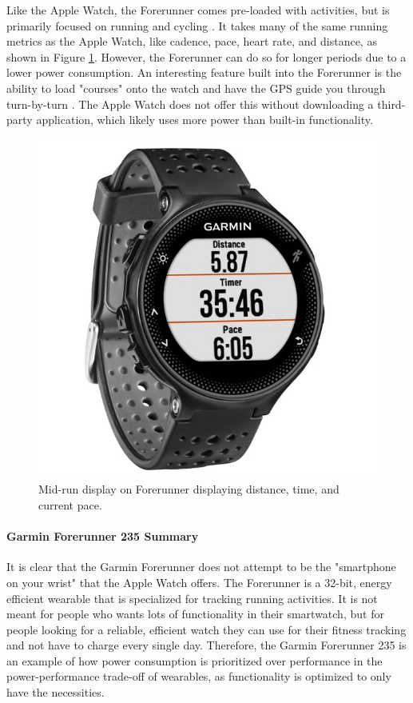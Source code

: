 Like the Apple Watch, the Forerunner comes pre-loaded with activities, but is primarily focused on
running and cycling \cite{garmin_price}. It takes many of the same running metrics as the Apple Watch,
like cadence, pace, heart rate, and distance, as shown in Figure \ref{fig:garm_disp}. 
However, the Forerunner can do so for longer periods due to a lower power consumption.
An interesting feature built into the Forerunner is the ability to load "courses" onto the watch and have
the GPS guide you through turn-by-turn \cite{garmin_course}. The Apple Watch does not offer this without downloading a third-party
application, which likely uses more power than built-in functionality.

\begin{figure}[h]
    \centering
    \includegraphics[scale=0.25]{media/garmin_running.jpg}
    \caption{Mid-run display on Forerunner displaying distance, time, and current pace.}
    \label{fig:garm_disp}
\end{figure}

\paragraph{Garmin Forerunner 235 Summary}
It is clear that the Garmin Forerunner does not attempt to be the "smartphone on your wrist" that the Apple
Watch offers. The Forerunner is a 32-bit, energy efficient wearable that is specialized for tracking running
activities. It is not meant for people who wants lots of functionality in their smartwatch, but for people
looking for a reliable, efficient watch they can use for their fitness tracking and not have to charge every
single day. Therefore, the Garmin Forerunner 235 is an example of how power consumption is prioritized over
performance in the power-performance trade-off of wearables, as functionality is optimized to only have the
necessities.

